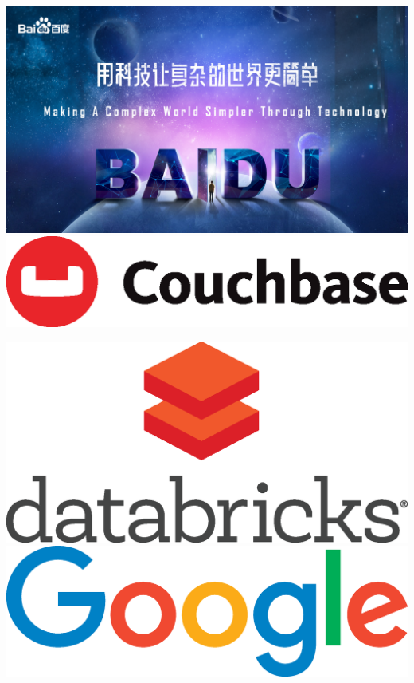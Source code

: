 \includegraphics[height=.49\textheight,width=\textwidth,keepaspectratio]{ads/baidu.jpg}
\vfill
\includegraphics[height=.49\textheight,width=\textwidth,keepaspectratio]{ads/couchbase.eps}
\pagebreak

\includegraphics[height=.49\textheight,width=\textwidth,keepaspectratio]{ads/databricks.eps}
\vfill
\includegraphics[height=.49\textheight,width=\textwidth,keepaspectratio]{ads/google.eps}
\pagebreak

